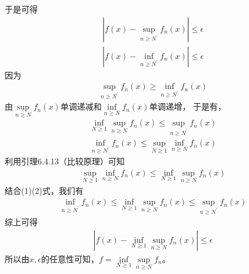 \documentclass{article}
\begin{document}
于是可得
\begin{align*}
  |f(x) - \sup\limits_{n \geq N^\prime} f_n (x)| \leq \epsilon \\
  |f(x) - \inf\limits_{n \geq N^\prime} f_n (x)| \leq \epsilon 
\end{align*}
因为
\begin{align*}
  \sup\limits_{n \geq N^\prime} f_n (x) \geq \inf\limits_{n \geq N^\prime} f_n (x)
\end{align*}
由$\sup\limits_{n \geq N} f_n (x)$单调递减和$\inf\limits_{n \geq N} f_n (x)$单调递增，
于是有，
\begin{align}
  \inf\limits_{N \geq 1} \sup\limits_{n \geq N} f_n(x) \leq \sup\limits_{n \geq N^\prime} f_n (x) \\
  \inf\limits_{n \geq N^\prime} f_n (x) \leq \sup\limits_{N \geq 1} \inf\limits_{n \geq N} f_n(x) 
\end{align}
利用引理6.4.13（比较原理）可知
\begin{align*}
  \sup\limits_{N \geq 1} \inf\limits_{n \geq N} f_n(x) \leq \inf\limits_{N \geq 1} \sup\limits_{n \geq N} f_n(x)
\end{align*}
结合(1)(2)式，我们有
\begin{align*}
  \inf\limits_{n \geq N^\prime} f_n (x) \leq  \inf\limits_{N \geq 1} \sup\limits_{n \geq N} f_n(x) \leq \sup\limits_{n \geq N^\prime} f_n (x)
\end{align*}
综上可得
\begin{align*}
  |f(x) - \inf\limits_{N \geq 1} \sup\limits_{n \geq N} f_n(x)| \leq \epsilon 
\end{align*}
所以由$x, \epsilon$的任意性可知，$f = \inf\limits_{N \geq 1} \sup\limits_{n \geq N} f_n$。
\end{document}
